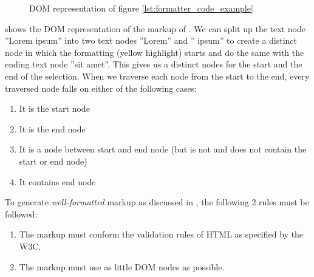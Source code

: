 \begin{figure}[!htb]
\centering
{}
\caption{DOM representation of figure \ref{lst:formatter_code_example}}
\label{fig:formatting_dom_tree}
\end{figure}

 shows the DOM representation of the markup of . We can split up the text node ''Lorem ipsum'' into two text nodes ''Lorem'' and '' ipsum'' to create a distinct node in which the formatting (yellow highlight) starts and do the same with the ending text node ''sit amet''. This gives us a distinct nodes for the start and the end of the selection. When we traverse each node from the start to the end, every traversed node falls on either of the following cases:

\begin{enumerate}
\item It is the start node
\item It is the end node
\item It is a node between start and end node (but is not and does not contain the start or end node)
\item It contains end node
\end{enumerate}

\noindent To generate \textit{well-formatted} markup as discussed in , the following 2 rules must be followed:

\begin{enumerate}
\item The markup must conform the validation rules of HTML as specified by the W3C.
\item The markup must use as little DOM nodes as possible.
\end{enumerate}

